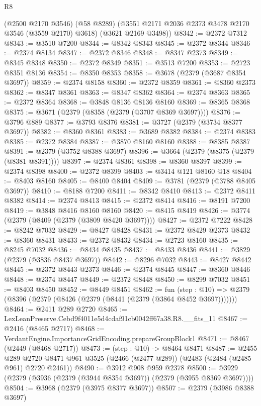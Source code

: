 \begin{lexlean}{R8}
\begin{coremodule}
      (@2500 @2170 @3546)
      (@58 @8289)
      (@3551 @2171 @2036 @2373 @3478 @2170 @3546 (@3559 @2170) @3618)
      (@3621 @2169 @3498))
@8342 := @2372 @7312
@8343 := @3510 @7200
@8344 := @8342 @8343
@8345 := @2372 @8344
@8346 := @2374 @8134
@8347 := @2372 @8346
@8348 := @8347 @2373
@8349 := @8345 @8348
@8350 := @2372 @8349
@8351 := @3513 @7200
@8353 := @2723 @8351 @8136
@8354 := @8350 @8353
@8358 := @3678 (@2379 (@3687 @8354 @3697))
@8359 := @2374 @8158
@8360 := @2372 @8359
@8361 := @8360 @2373
@8362 := @8347 @8361
@8363 := @8347 @8362
@8364 := @2374 @8363
@8365 := @2372 @8364
@8368 := @3848 @8136 @8136 @8160
@8369 := @8365 @8368
@8375 := @3671 (@2379 (@8358 (@2379 (@3707 @8369 @3697))))
@8376 := @3796 @889
@8377 := @3793 @8376
@8381 := @3727 (@2379 (@3734 @8377 @3697))
@8382 := @8360 @8361
@8383 := @3689 @8382
@8384 := @2374 @8383
@8385 := @2372 @8384
@8387 := @3870 @8160 @8160
@8388 := @8385 @8387
@8391 := @2379 (@3752 @8388 @3697)
@8396 := @3664 (@2379 (@8375 (@2379 (@8381 @8391))))
@8397 := @2374 @8361
@8398 := @8360 @8397
@8399 := @2374 @8398
@8400 := @2372 @8399
@8403 := @3414 @121 @8160 @18
@8404 := @8403 @8160
@8405 := @8400 @8404
@8409 := @3781 (@2379 (@3788 @8405 @3697))
@8410 := @8188 @7200
@8411 := @8342 @8410
@8413 := @2372 @8411 @8382
@8414 := @2374 @8413
@8415 := @2372 @8414
@8416 := @8191 @7200
@8419 := @3848 @8416 @8160 @8160
@8420 := @8415 @8419
@8426 := @3774 (@2379 (@8409 (@2379 (@3809 @8420 @3697))))
@8427 := @2372 @7222
@8428 := @8242 @7032
@8429 := @8427 @8428
@8431 := @2372 @8429 @2373
@8432 := @8360 @8431
@8433 := @2372 @8432
@8434 := @2723 @8160
@8435 := @8245 @7032
@8436 := @8434 @8435
@8437 := @8433 @8436
@8441 := @3829 (@2379 (@3836 @8437 @3697))
@8442 := @8296 @7032
@8443 := @8427 @8442
@8445 := @2372 @8443 @2373
@8446 := @2374 @8445
@8447 := @8360 @8446
@8448 := @2374 @8447
@8449 := @2372 @8448
@8450 := @8299 @7032
@8451 := @8403 @8450
@8452 := @8449 @8451
@8462 := fun (step : @10) =>
  @2379 (@8396 (@2379 (@8426 (@2379 (@8441 (@2379 (@3864 @8452 @3697)))))))
@8464 := @2411 @289 @2720
@8465 := LexLeanPreserve.Cebd9f4011e5d4cdaf91cb0042ff67a38.R8.__fits_11
@8467 := @2416 (@8465 @2717)
@8468 := VerdantEngine.ImportanceGridEncoding.prepareGroupBlock1
@8471 := @8467 (@2449 (@8468 @2717))
@8473 := (step : @10) -> @8464 @8471
@8487 := @2455
    @289
    @2720
    @8471
    @961
    @3525
    (@2466 (@2477 @289))
    (@2483 (@2484 (@2485 @961) @2720 @2461))
@8490 := @3912 @908 @959 @2378
@8500 := @3929 (@2379 (@3936 (@2379 (@3944 @8354 @3697)) (@2379 (@3955 @8369 @3697))))
@8504 := @3968 (@2379 (@3975 @8377 @3697))
@8507 := @2379 (@3986 @8388 @3697)

\end{coremodule}
\end{lexlean}
